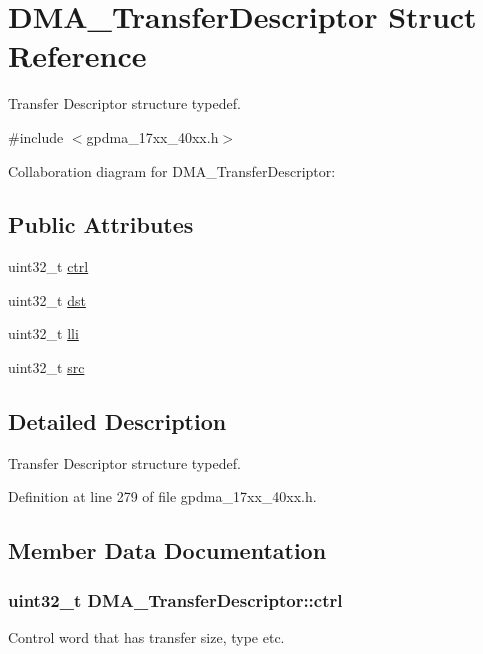 \hypertarget{structDMA__TransferDescriptor}{}\section{D\+M\+A\+\_\+\+Transfer\+Descriptor Struct Reference}
\label{structDMA__TransferDescriptor}


Transfer Descriptor structure typedef.  




{\ttfamily \#include $<$gpdma\+\_\+17xx\+\_\+40xx.\+h$>$}



Collaboration diagram for D\+M\+A\+\_\+\+Transfer\+Descriptor\+:
\subsection*{Public Attributes}
\begin{DoxyCompactItemize}
\item 
uint32\+\_\+t \hyperlink{structDMA__TransferDescriptor_a6b9f6124eb0961c8ccea5c455d135e60}{ctrl}
\item 
uint32\+\_\+t \hyperlink{structDMA__TransferDescriptor_a661ff33fa31f405b89905f385299e271}{dst}
\item 
uint32\+\_\+t \hyperlink{structDMA__TransferDescriptor_ad53035ccb28664c56800a73bb20a7c79}{lli}
\item 
uint32\+\_\+t \hyperlink{structDMA__TransferDescriptor_a03862efce0e0845dce0cd47e51ed038f}{src}
\end{DoxyCompactItemize}


\subsection{Detailed Description}
Transfer Descriptor structure typedef. 

Definition at line 279 of file gpdma\+\_\+17xx\+\_\+40xx.\+h.



\subsection{Member Data Documentation}
\subsubsection[{\texorpdfstring{ctrl}{ctrl}}]{\setlength{\rightskip}{0pt plus 5cm}uint32\+\_\+t D\+M\+A\+\_\+\+Transfer\+Descriptor\+::ctrl}\hypertarget{structDMA__TransferDescriptor_a6b9f6124eb0961c8ccea5c455d135e60}{}\label{structDMA__TransferDescriptor_a6b9f6124eb0961c8ccea5c455d135e60}
Control word that has transfer size, type etc. 

